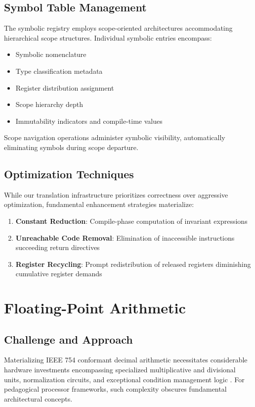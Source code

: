 \documentclass[conference,10pt,twocolumn]{IEEEtran}
\begin{document}
\subsection{Symbol Table Management}

The symbolic registry employs scope-oriented architectures accommodating hierarchical scope structures. Individual symbolic entries encompass:

\begin{itemize}
\item Symbolic nomenclature
\item Type classification metadata
\item Register distribution assignment
\item Scope hierarchy depth
\item Immutability indicators and compile-time values
\end{itemize}

Scope navigation operations administer symbolic visibility, automatically eliminating symbols during scope departure.

\subsection{Optimization Techniques}

While our translation infrastructure prioritizes correctness over aggressive optimization, fundamental enhancement strategies materialize:

\begin{enumerate}
\item \textbf{Constant Reduction}: Compile-phase computation of invariant expressions
\item \textbf{Unreachable Code Removal}: Elimination of inaccessible instructions succeeding return directives
\item \textbf{Register Recycling}: Prompt redistribution of released registers diminishing cumulative register demands
\end{enumerate}

\section{Floating-Point Arithmetic}

\subsection{Challenge and Approach}

Materializing IEEE 754 conformant decimal arithmetic necessitates considerable hardware investments encompassing specialized multiplicative and divisional units, normalization circuits, and exceptional condition management logic \cite{ieee754}. For pedagogical processor frameworks, such complexity obscures fundamental architectural concepts.
\end{document}
